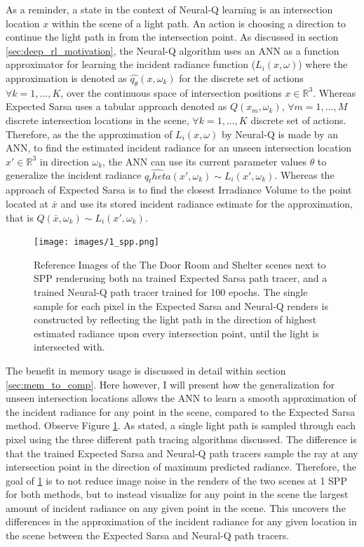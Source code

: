 \documentclass[../dissertation.tex]{subfiles}
\begin{document}
As a reminder, a state in the context of Neural-Q learning is an intersection location $x$ within the scene of a light path. An action is choosing a direction to continue the light path in from the intersection point. As discussed in section \ref{sec:deep_rl_motivation}, the Neural-Q algorithm uses an ANN as a function approximator for learning the incident radiance function ($L_i(x, \omega)$) where the approximation is denoted as $\hat{q_\theta}(x, \omega_k)$ for the discrete set of actions $\forall k = 1, ..., K$, over the continuous space of intersection positions $x \in \mathbb{R}^3$. Whereas Expected Sarsa uses a tabular approach denoted as $Q(x_m, \omega_k)$,  $\forall m = 1, ..., M$ discrete intersection locations in the scene, $\forall k = 1, ..., K$ discrete set of actions. Therefore, as the the approximation of $L_i(x, \omega)$ by Neural-Q is made by an ANN, to find the estimated incident radiance for an unseen intersection location $x' \in \mathbb{R}^3$ in direction $\omega_k$, the ANN can use its current parameter values $\theta$  to generalize the incident radiance $\hat{q_theta}(x', \omega_k) \sim L_i(x', \omega_k)$. Whereas the approach of Expected Sarsa is to find the closest Irradiance Volume to the point located at $\bar{x}$ and use its stored incident radiance estimate for the approximation, that is $Q(\bar{x}, \omega_k) \sim L_i(x', \omega_k)$. 

\begin{figure}[h]
\centering
\texttt{[image: images/1\_spp.png]}   
\caption{Reference Images of the The Door Room and Shelter scenes next to SPP renderusing both na trained Expected Sarsa path tracer, and a trained Neural-Q path tracer trained for 100 epochs. The single sample for each pixel in the Expected Sarsa and Neural-Q renders is constructed by reflecting the light path in the direction of highest estimated radiance upon every intersection point, until the light is intersected with.}
\label{fig:1_spp_max_dir}
\end{figure}

The benefit in memory usage is discussed in detail within section \ref{sec:mem_to_comp}. Here however, I will present how the generalization for unseen intersection locations allows the ANN to learn a smooth approximation of the incident radiance for any point in the scene, compared to the Expected Sarsa method. Observe Figure \ref{fig:1_spp_max_dir}. As stated, a single light path is sampled through each pixel using the three different path tracing algorithms discussed. The difference is that the trained Expected Sarsa and Neural-Q path tracers sample the ray at any intersection point in the direction of maximum predicted radiance. Therefore, the goal of \ref{fig:1_spp_max_dir} is to not reduce image noise in the renders of the two scenes at 1 SPP for both methods, but to instead visualize for any point in the scene the largest amount of incident radiance on any given point in the scene. This uncovers the differences in the approximation of the incident radiance for any given location in the scene between the Expected Sarsa and Neural-Q path tracers.\\
\end{document}
